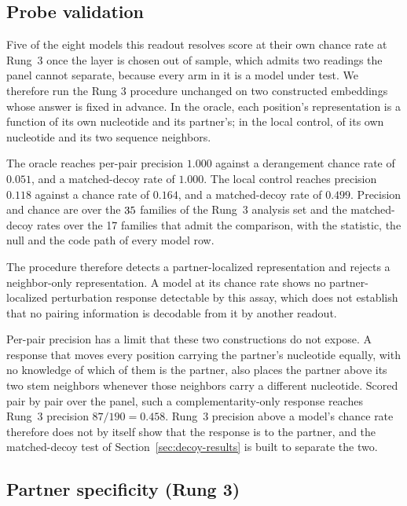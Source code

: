\documentclass[11pt]{article}
\begin{document}
\subsection{Probe validation}
\label{sec:probe-validation}

Five of the eight models this readout resolves score at their own chance rate
at Rung~3 once the layer is chosen out of sample, which admits two
readings the panel cannot separate, because every arm in it is a model under test.
We therefore run the Rung 3 procedure unchanged on two constructed embeddings
whose answer is fixed in advance. In the oracle, each position's representation
is a function of its own nucleotide and its partner's; in the local control, of
its own nucleotide and its two sequence neighbors.

The oracle reaches per-pair precision $1.000$ against a derangement chance rate
of $0.051$, and a matched-decoy rate of $1.000$. The local control reaches
precision $0.118$ against a chance rate of $0.164$, and a matched-decoy rate of
$0.499$. Precision and chance are over the $35{}$ families of the
Rung~3 analysis set and the matched-decoy rates over the 17 families that admit
the comparison, with the statistic, the null and the code path of every model
row.

The procedure therefore detects a partner-localized representation and rejects
a neighbor-only representation. A model at its chance rate shows no
partner-localized perturbation response detectable by this assay, which does not
establish that no pairing information is decodable from it by another readout.

Per-pair precision has a limit that these two constructions do not expose. A
response that moves every position carrying the partner's nucleotide equally,
with no knowledge of which of them is the partner, also places the partner above
its two stem neighbors whenever those neighbors carry a different nucleotide.
Scored pair by pair over the panel, such a complementarity-only response reaches
Rung~3 precision $87/190 = 0.458$. Rung~3 precision above a model's chance rate
therefore does not by itself show that the response is to the partner, and the
matched-decoy test of Section~\ref{sec:decoy-results} is built to separate the
two.

\subsection{Partner specificity (Rung 3)}
\label{sec:ps-results}
\end{document}
